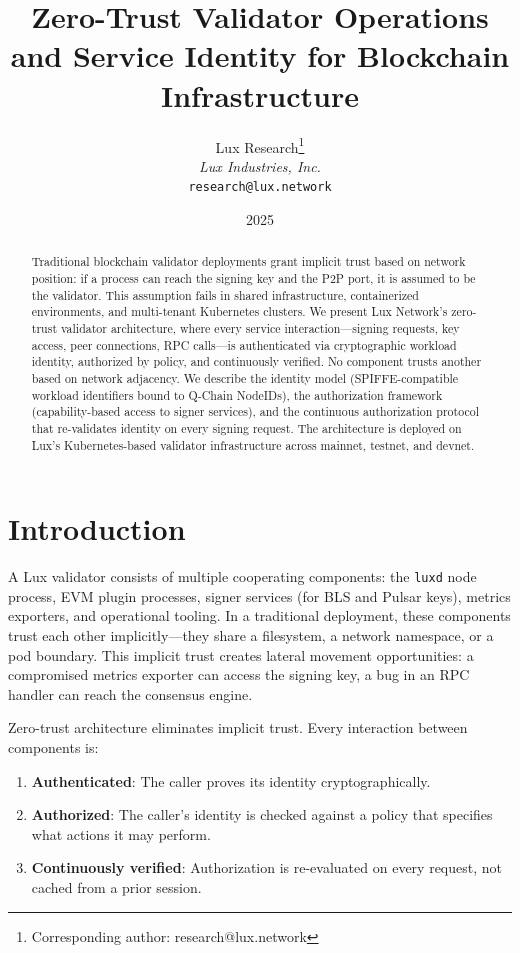 \documentclass[11pt]{article}
\title{Zero-Trust Validator Operations and Service Identity for Blockchain Infrastructure}
\author{
Lux Research\thanks{Corresponding author: research@lux.network}\\
\textit{Lux Industries, Inc.}\\
\texttt{research@lux.network}
}
\date{2025}
\begin{document}
\luxcoverpage

\begin{abstract}
Traditional blockchain validator deployments grant implicit trust based on network position: if a process can reach the signing key and the P2P port, it is assumed to be the validator. This assumption fails in shared infrastructure, containerized environments, and multi-tenant Kubernetes clusters. We present Lux Network's zero-trust validator architecture, where every service interaction---signing requests, key access, peer connections, RPC calls---is authenticated via cryptographic workload identity, authorized by policy, and continuously verified. No component trusts another based on network adjacency. We describe the identity model (SPIFFE-compatible workload identifiers bound to Q-Chain NodeIDs), the authorization framework (capability-based access to signer services), and the continuous authorization protocol that re-validates identity on every signing request. The architecture is deployed on Lux's Kubernetes-based validator infrastructure across mainnet, testnet, and devnet.
\end{abstract}

\section{Introduction}

A Lux validator consists of multiple cooperating components: the \texttt{luxd} node process, EVM plugin processes, signer services (for BLS and Pulsar keys), metrics exporters, and operational tooling. In a traditional deployment, these components trust each other implicitly---they share a filesystem, a network namespace, or a pod boundary. This implicit trust creates lateral movement opportunities: a compromised metrics exporter can access the signing key, a bug in an RPC handler can reach the consensus engine.

Zero-trust architecture eliminates implicit trust. Every interaction between components is:
\begin{enumerate}
\item \textbf{Authenticated}: The caller proves its identity cryptographically.
\item \textbf{Authorized}: The caller's identity is checked against a policy that specifies what actions it may perform.
\item \textbf{Continuously verified}: Authorization is re-evaluated on every request, not cached from a prior session.
\end{enumerate}
\end{document}
